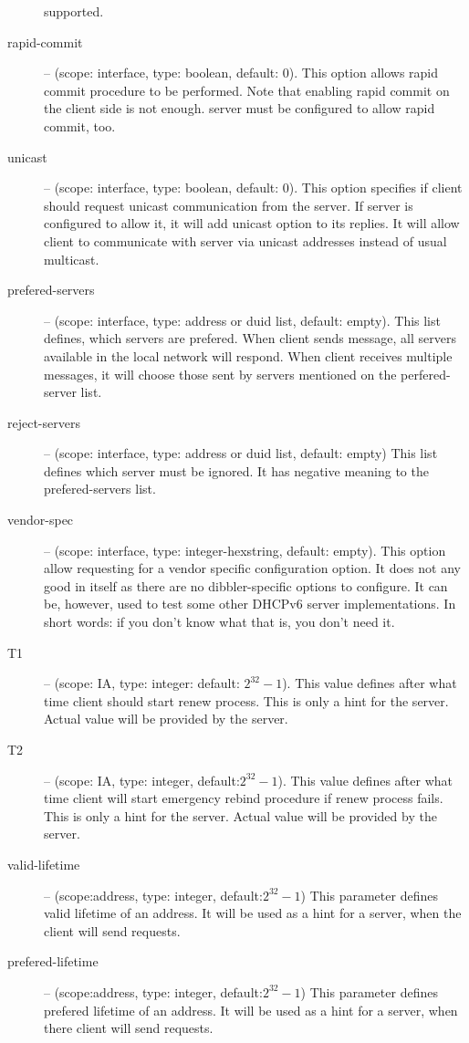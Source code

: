\begin{description}
	    supported.
 \item[rapid-commit] -- (scope: interface, type: boolean, default:
	    0). This option allows rapid commit procedure to be
	    performed. Note that enabling rapid commit on the client
	    side is not enough. server must be configured to allow
	    rapid commit, too.
 \item[unicast] -- (scope: interface, type: boolean, default: 0). This
	    option specifies if client should request unicast
	    communication from the server. If server is configured to
	    allow it, it will add unicast option to its replies. It will
	    allow client to communicate with server via unicast
	    addresses instead of usual multicast.
 \item[prefered-servers] -- (scope: interface, type: address or duid list, default:
	    empty). This list defines, which servers are prefered. When
	    client sends  message, all servers available in
	    the local network will respond. When client receives
	    multiple  messages, it will choose those sent
	    by servers mentioned on the perfered-server list.
 \item[reject-servers] -- (scope: interface, type: address or duid list, default:
	    empty) This list defines which server must be ignored. It
	    has negative meaning to the prefered-servers list.
 \item[vendor-spec] -- (scope: interface, type: integer-hexstring,
	    default: empty). This option allow requesting for a vendor
	    specific configuration option. It does not any good in
	    itself as there are no dibbler-specific options to
	    configure. It can be, however, used to test some other
	    DHCPv6 server implementations. In short words: if you don't
	    know what that is, you don't need it.
 \item[T1] -- (scope: IA, type: integer: default: $2^{32}-1$). This value
	    defines after what time client should start renew
	    process. This is only a hint for the server. Actual value
	    will be provided by the server.
 \item[T2] -- (scope: IA, type: integer, default:$2^{32}-1$). This value
	    defines after what time client will start emergency rebind
	    procedure if renew process fails. This is only a hint for
	    the server. Actual value will be provided by the server.
 \item[valid-lifetime] -- (scope:address, type: integer,
	    default:$2^{32}-1$) This parameter defines valid lifetime of
	    an address. It will be used as a hint for a server, when the
	    client will send requests.
 \item[prefered-lifetime] -- (scope:address, type: integer,
	    default:$2^{32}-1$) This parameter defines prefered lifetime
	    of an address. It will be used as a hint for a server, when
	    there client will send requests.
\end{description}

